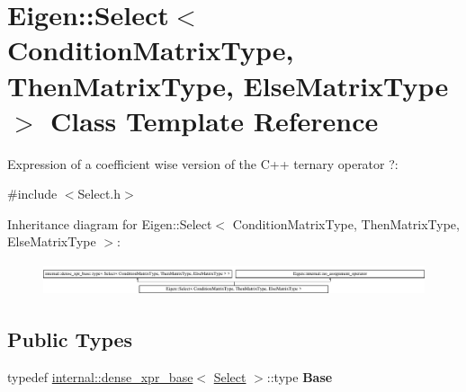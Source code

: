 \hypertarget{class_eigen_1_1_select}{}\section{Eigen\+::Select$<$ Condition\+Matrix\+Type, Then\+Matrix\+Type, Else\+Matrix\+Type $>$ Class Template Reference}
\label{class_eigen_1_1_select}


Expression of a coefficient wise version of the C++ ternary operator ?\+:  




{\ttfamily \#include $<$Select.\+h$>$}

Inheritance diagram for Eigen\+::Select$<$ Condition\+Matrix\+Type, Then\+Matrix\+Type, Else\+Matrix\+Type $>$\+:\begin{figure}[H]
\begin{center}
\leavevmode
\includegraphics[height=0.955631cm]{class_eigen_1_1_select}
\end{center}
\end{figure}
\subsection*{Public Types}
\begin{DoxyCompactItemize}
\item 
\mbox{\label{class_eigen_1_1_select_a8626a59e2f93e1751db5d1382199bfad}} 
typedef \mbox{\hyperlink{struct_eigen_1_1internal_1_1dense__xpr__base}{internal\+::dense\+\_\+xpr\+\_\+base}}$<$ \mbox{\hyperlink{class_eigen_1_1_select}{Select}} $>$\+::type {\bfseries Base}
\end{DoxyCompactItemize}
